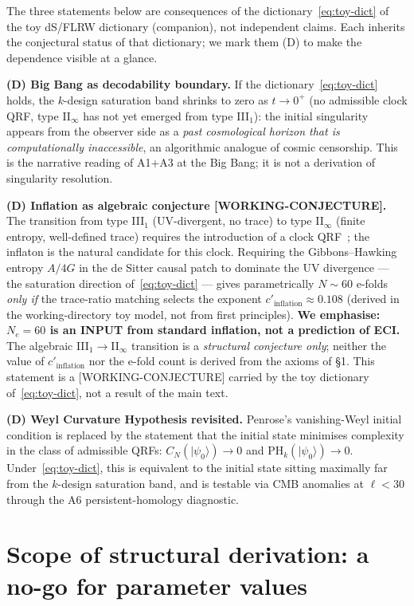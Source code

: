 \documentclass[reprint,amsmath,amssymb,aps,prd,superscriptaddress]{revtex4-2}
\providecommand{\1}{\mathbf{1}}
\begin{document}
The three statements below are consequences of the dictionary~\eqref{eq:toy-dict} of the toy dS/FLRW dictionary (companion), not independent claims. Each inherits the conjectural status of that dictionary; we mark them (D) to make the dependence visible at a glance.

\smallskip\noindent\textbf{(D) Big Bang as decodability boundary.}
If the dictionary~\eqref{eq:toy-dict} holds, the $k$-design saturation band shrinks to zero as $t \to 0^+$ (no admissible clock QRF, type II$_\infty$ has not yet emerged from type III$_1$): the initial singularity appears from the observer side as a \emph{past cosmological horizon that is computationally inaccessible}, an algorithmic analogue of cosmic censorship. This is the narrative reading of A1+A3 at the Big Bang; it is not a derivation of singularity resolution.

\smallskip\noindent\textbf{(D) Inflation as algebraic conjecture [WORKING-CONJECTURE].}
The transition from type III$_1$ (UV-divergent, no trace) to type II$_\infty$ (finite entropy, well-defined trace) requires the introduction of a clock QRF~\cite{CLPW2023}; the inflaton is the natural candidate for this clock. Requiring the Gibbons--Hawking entropy $A/4G$ in the de Sitter causal patch to dominate the UV divergence --- the saturation direction of~\eqref{eq:toy-dict} --- gives parametrically $N \sim 60$ e-folds \emph{only if} the trace-ratio matching selects the exponent $c'_{\mathrm{inflation}} \approx 0.108$ (derived in the working-directory toy model, not from first principles). \textbf{We emphasise: $N_e = 60$ is an INPUT from standard inflation, not a prediction of ECI.} The algebraic III$_1\!\to$II$_\infty$ transition is a \emph{structural conjecture only}; neither the value of $c'_{\mathrm{inflation}}$ nor the e-fold count is derived from the axioms of \S1. This statement is a [WORKING-CONJECTURE] carried by the toy dictionary of~\eqref{eq:toy-dict}, not a result of the main text.

\smallskip\noindent\textbf{(D) Weyl Curvature Hypothesis revisited.}
Penrose's vanishing-Weyl initial condition is replaced by the statement that the initial state minimises complexity in the class of admissible QRFs: $C_N(|\psi_0\rangle) \to 0$ and $\mathrm{PH}_k(|\psi_0\rangle) \to 0$. Under~\eqref{eq:toy-dict}, this is equivalent to the initial state sitting maximally far from the $k$-design saturation band, and is testable via CMB anomalies at $\ell < 30$ through the A6 persistent-homology diagnostic.

\section{Scope of structural derivation: a no-go for parameter values}
\label{sec:scope}
\end{document}
